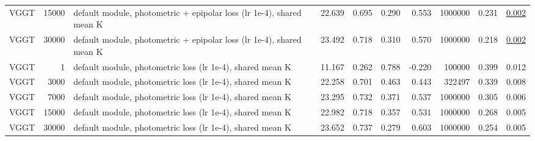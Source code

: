 \begin{table}[H]
\begin{tabular}{lrlrrrrrrr}
VGGT & 15000 & default module, photometric + epipolar loss (lr 1e-4), shared mean K & 22.639 & 0.695 & 0.290 & 0.553 & 1000000 & 0.231 & \underline{0.002} \\
VGGT & 30000 & default module, photometric + epipolar loss (lr 1e-4), shared mean K & 23.492 & 0.718 & 0.310 & 0.570 & 1000000 & 0.218 & \underline{0.002} \\
VGGT & 1 & default module, photometric loss (lr 1e-4), shared mean K & 11.167 & 0.262 & 0.788 & -0.220 & 100000 & 0.399 & 0.012 \\
VGGT & 3000 & default module, photometric loss (lr 1e-4), shared mean K & 22.258 & 0.701 & 0.463 & 0.443 & 322497 & 0.339 & 0.008 \\
VGGT & 7000 & default module, photometric loss (lr 1e-4), shared mean K & 23.295 & 0.732 & 0.371 & 0.537 & 1000000 & 0.305 & 0.006 \\
VGGT & 15000 & default module, photometric loss (lr 1e-4), shared mean K & 22.982 & 0.718 & 0.357 & 0.531 & 1000000 & 0.268 & 0.005 \\
VGGT & 30000 & default module, photometric loss (lr 1e-4), shared mean K & 23.652 & 0.737 & 0.279 & 0.603 & 1000000 & 0.254 & 0.005 \\
\bottomrule
\end{tabular}
\end{table}